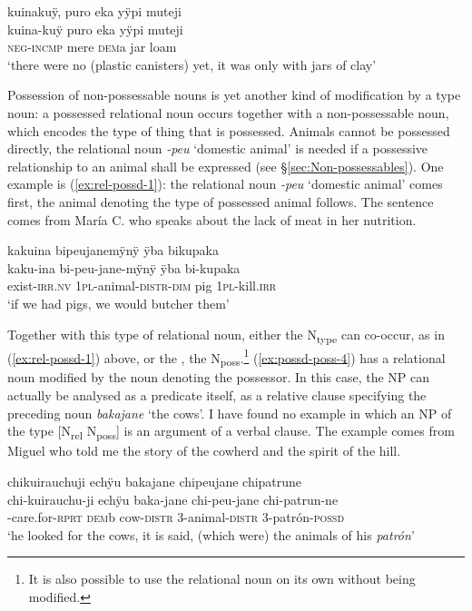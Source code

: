 \ea\label{ex:NP-2}
\begingl
\glpreamble kuinakuÿ, puro eka yÿpi muteji\\
\gla kuina-kuÿ puro eka yÿpi muteji\\
\glb \textsc{neg}-\textsc{incmp} mere \textsc{dem}a jar loam\\
\glft ‘there were no (plastic canisters) yet, it was only with jars of clay’
\endgl
\trailingcitation{[jxx-p120515l-2.058]}
\xe

Possession of non-possessable nouns is yet another kind of modification by a type noun: a possessed relational noun occurs together with a non-possessable noun, which encodes the type of thing that is possessed.  Animals cannot be possessed directly, the relational noun \textit{-peu} ‘domestic animal’ is needed if a possessive relationship to an animal shall be expressed (see §\ref{sec:Non-possessables}). One example is (\ref{ex:rel-possd-1}): the relational noun \textit{-peu} ‘domestic animal’ comes first, the animal denoting the type of possessed animal follows. The sentence comes from María C. who speaks about the lack of meat in her nutrition.

\ea\label{ex:rel-possd-1}
\begingl
\glpreamble kakuina bipeujanemÿnÿ ÿba bikupaka\\
\gla kaku-ina bi-peu-jane-mÿnÿ ÿba bi-kupaka\\ 
\glb exist-\textsc{irr.nv} 1\textsc{pl}-animal-\textsc{distr}-\textsc{dim} pig 1\textsc{pl}-kill.\textsc{irr}\\ 
\glft ‘if we had pigs, we would butcher them’\\ 
\endgl
\trailingcitation{[uxx-p110825l.200]}
\xe


Together with this type of relational noun, either the N\textsubscript{type} can co-occur, as in (\ref{ex:rel-possd-1}) above, or the , the N\textsubscript{poss}.\footnote{It is also possible to use the relational noun on its own without being modified.}  (\ref{ex:possd-poss-4}) has a relational noun modified by the noun denoting the possessor. In this case, the NP can actually be analysed as a predicate itself, as a relative clause specifying the preceding noun \textit{bakajane} ‘the cows’. I have found no example in which an NP of the type [N\textsubscript{rel} N\textsubscript{poss}] is an argument of a verbal clause. The example comes from Miguel who told me the story of the cowherd and the spirit of the hill.

\ea\label{ex:possd-poss-4}
\begingl
\glpreamble chikuirauchuji echÿu bakajane chipeujane chipatrune\\
\gla chi-kuirauchu-ji echÿu baka-jane chi-peu-jane chi-patrun-ne\\
-care.for-\textsc{rprt} \textsc{dem}b cow-\textsc{distr} 3-animal-\textsc{distr} 3-patrón-\textsc{possd}\\
\glft ‘he looked for the cows, it is said, (which were) the animals of his \textit{patrón}’
\endgl
\trailingcitation{[mxx-n151017l-1.02]}
\xe

